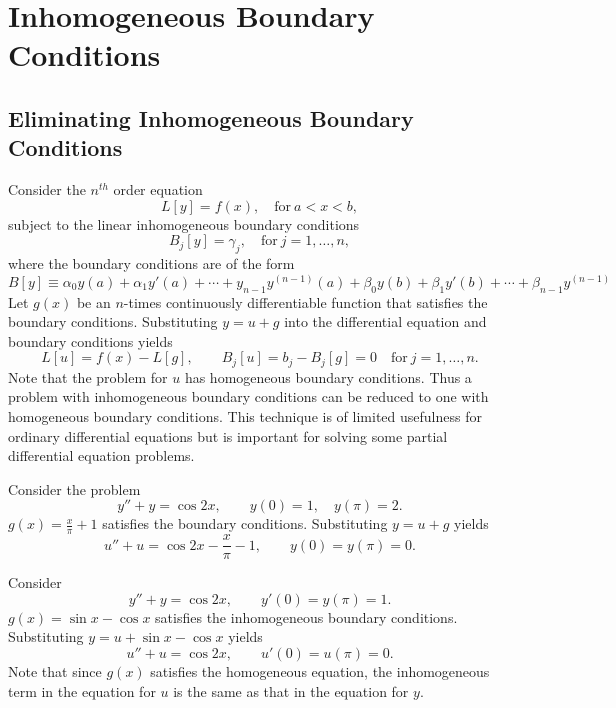 \section{Inhomogeneous Boundary Conditions}



\subsection{Eliminating Inhomogeneous Boundary Conditions}


Consider the $n^{t h}$ order equation
\[
L[y] = f(x), \quad \mathrm{for}\ a < x < b,
\]
subject to the linear inhomogeneous boundary conditions
\[ B_j[y] = \gamma_j, \quad \mathrm{for}\ j = 1, \ldots, n, \]
where the boundary conditions are of the form
\[
B[y] \equiv \alpha_0 y(a) + \alpha_1 y'(a) + \cdots + y_{n-1} y^{(n-1)}(a)
+ \beta_0 y(b) + \beta_1 y'(b) + \cdots + \beta_{n-1} y^{(n-1)}
\]
Let $g(x)$ be an $n$-times continuously differentiable function that 
satisfies the boundary conditions.  Substituting $y = u + g$ into the 
differential equation and boundary conditions yields
\[ L[u] = f(x) - L[g], \qquad B_j[u] = b_j - B_j[g] = 0 
\quad \mathrm{for}\ j = 1,\ldots,n.\]
Note that the problem for $u$ has homogeneous boundary conditions.  Thus a
problem with inhomogeneous boundary conditions can be reduced to one with
homogeneous boundary conditions.  This technique is of limited usefulness
for ordinary differential equations but is important for solving some 
partial differential equation problems.






\begin{Example}
  Consider the problem
  \[ y'' + y = \cos 2x, \qquad y(0) = 1, \quad y(\pi) = 2.\]
  $g(x) = \frac{x}{\pi} + 1$ satisfies the boundary conditions.  Substituting
  $y = u + g$ yields
  \[ u'' + u = \cos 2x - \frac{x}{\pi} - 1, \qquad y(0) = y(\pi) = 0. \]
\end{Example}







\begin{Example}
  Consider
  \[ y'' + y = \cos 2x, \qquad y'(0) = y(\pi) = 1. \]
  $g(x) = \sin x - \cos x$ satisfies the inhomogeneous boundary conditions.
  Substituting $y = u + \sin x - \cos x$ yields
  \[ u'' + u = \cos 2x, \qquad u'(0) = u(\pi) = 0. \]
  Note that since $g(x)$ satisfies the homogeneous equation, the inhomogeneous
  term in the equation for $u$ is the same as that in the equation for $y$.
\end{Example}









